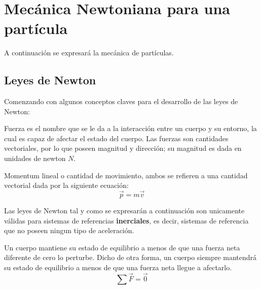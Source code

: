 \documentclass[/home/hernan/Documentos/Apuntes_mecanica_teorica/main.tex]{subfiles}
\begin{document}
\section{Mecánica Newtoniana para una partícula}\label{sec: N.particula }

	A continuación se expresará la mecánica de partículas.

	\subsection{Leyes de Newton}
	
	Comenzando con algunos conceptos claves para el desarrollo de las leyes de Newton:

	\begin{definition}
		Fuerza es el nombre que se le da a la interacción entre un cuerpo y su entorno, la cual es capaz de afectar el estado del cuerpo. Las fuerzas son cantidades vectoriales, por lo que poseen magnitud y dirección; su magnitud es dada en unidades de newton $N$.
	\end{definition}

	\begin{definition}
		Momentum lineal o cantidad de movimiento, ambos se refieren a una cantidad vectorial dada por la siguiente ecuación:
		\begin{equation}
			\vec{p} = m \vec{v}
			\label{eq: momentuml}
		\end{equation}
	\end{definition}

	
	Las leyes de Newton tal y como se expresarán a continuación son unicamente válidas para sistemas de referencias \textbf{inerciales}, es decir, sistemas de referencia que no poseen ningun tipo de aceleración.


	\begin{definition}
		Un cuerpo mantiene su estado de equilibrio a menos de que una fuerza neta diferente de cero lo perturbe. Dicho de otra forma, un cuerpo siempre mantendrá su estado de equilibrio a menos de que una fuerza neta llegue a afectarlo.
		\begin{equation}
			\sum \vec{F} = \vec{0}
			\label{eq: Nfirstlaw}
		\end{equation}
		
	\end{definition}
\end{document}
